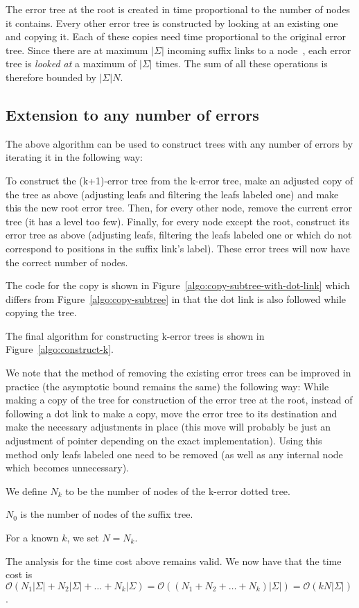 The error tree at the root is created in time proportional to the number of nodes it contains. Every other error tree is constructed by looking at an existing one and copying it. Each of these copies need time proportional to the original error tree. Since there are at maximum $|\Sigma|$ incoming suffix links to a node~\cite{}, each error tree is \emph{looked at} a maximum of $|\Sigma|$ times. The sum of all these operations is therefore bounded by $|\Sigma|N$.

\subsection{Extension to any number of errors}\label{subsec:construct-k-larger-1}

The above algorithm can be used to construct trees with any number of errors by iterating it in the following way:

To construct the (k+1)-error tree from the k-error tree, make an adjusted copy of the tree as above (adjusting leafs and filtering the leafs labeled one) and make this the new root error tree. Then, for every other node, remove the current error tree (it has a level too few). Finally, for every node except the root, construct its error tree as above (adjusting leafs, filtering the leafs labeled one or which do not correspond to positions in the suffix link's label). These error trees will now have the correct number of nodes.



The code for the copy is shown in Figure~\ref{algo:copy-subtree-with-dot-link} which differs from Figure~\ref{algo:copy-subtree} in that the dot link is also followed while copying the tree.



The final algorithm for constructing k-error trees is shown in Figure~\ref{algo:construct-k}.

We note that the method of removing the existing error trees can be improved in practice (the asymptotic bound remains the same) the following way: While making a copy of the tree for construction of the error tree at the root, instead of following a dot link to make a copy, move the error tree to its destination and make the necessary adjustments in place (this move will probably be just an adjustment of pointer depending on the exact implementation). Using this method only leafs labeled one need to be removed (as well as any internal node which becomes unnecessary).


\begin{definition}
We define $N_k$ to be the number of nodes of the k-error dotted tree.

$N_0$ is the number of nodes of the suffix tree.

For a known $k$, we set $N=N_k$.
\end{definition}


The analysis for the time cost above remains valid. We now have that the time cost is $\mathcal{O}(N_1|\Sigma|+N_2|\Sigma|+\dots+N_k|\Sigma)=\mathcal{O}((N_1+N_2+\dots+N_k)|\Sigma|)=\mathcal{O}(kN|\Sigma|)$.

